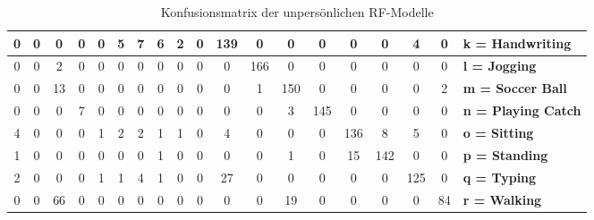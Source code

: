 \begin{table}
\begin{tabular}{|c|c|c|c|c|c|c|c|c|c|c|c|c|c|c|c|c|c||l|}
		\hline 
		0 & 0 & 0 & 0 & 0 & 5 & 7 & 6 & 2 & 0 & 139 & 0 & 0 & 0 & 0 & 0 & 4 & 0 & \textbf{k = Handwriting} \\
		\hline 
		0 & 0 & 2 & 0 & 0 & 0 & 0 & 0 & 0 & 0 & 0 & 166 & 0 & 0 & 0 & 0 & 0 & 0 & \textbf{l = Jogging} \\
		\hline 
		0 & 0 &13 & 0 & 0 & 0 & 0 & 0 & 0 & 0 & 0 & 1 & 150 & 0 & 0 & 0 & 0 & 2 & \textbf{m = Soccer Ball} \\
		\hline 
		0 & 0 & 0 & 7 & 0 & 0 & 0 & 0 & 0 & 0 & 0 & 0 & 3 & 145 & 0 & 0 & 0 & 0 & \textbf{n = Playing Catch} \\
		\hline 
		4 & 0 & 0 & 0 & 1 & 2 & 2 & 1 & 1 & 0 & 4 & 0 & 0 & 0 & 136 & 8 & 5 & 0 & \textbf{o = Sitting} \\
		\hline 
		1 & 0 & 0 & 0 & 0 & 0 & 0 & 1 & 0 & 0 & 0 & 0 & 1 & 0 &15 & 142 & 0 & 0 & \textbf{p = Standing} \\
		\hline 
		2 & 0 & 0 & 0 & 1 & 1 & 4 & 1 & 0 & 0 & 27 & 0 & 0 & 0 & 0 & 0 & 125 & 0 & \textbf{q = Typing} \\
		\hline 
		0 & 0 &66 & 0 & 0 & 0 & 0 & 0 & 0 & 0 & 0 & 0 & 19 & 0 & 0 & 0 & 0 & 84 & \textbf{r = Walking} \\
		\hline 
	\end{tabular}
	\caption{Konfusionsmatrix der unpersönlichen \ac{RF}-Modelle}
	\label{tab:confusion-impersonal-rf}
\end{table}

